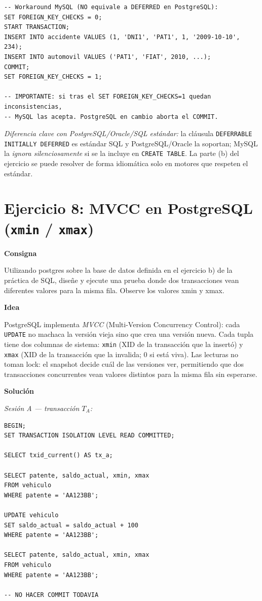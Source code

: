 \documentclass[11pt,a4paper]{article}
\newcommand{\itemcabecera}[1]{\noindent\textbf{#1}\par\medskip}
\newcommand{\bloqueConsigna}{\itemcabecera{Consigna}}
\newcommand{\bloqueIdea}{\itemcabecera{Idea}}
\newcommand{\bloqueSolucion}{\itemcabecera{Soluci\'on}}
\begin{document}
\begin{lstlisting}
-- Workaround MySQL (NO equivale a DEFERRED en PostgreSQL):
SET FOREIGN_KEY_CHECKS = 0;
START TRANSACTION;
INSERT INTO accidente VALUES (1, 'DNI1', 'PAT1', 1, '2009-10-10', 234);
INSERT INTO automovil VALUES ('PAT1', 'FIAT', 2010, ...);
COMMIT;
SET FOREIGN_KEY_CHECKS = 1;

-- IMPORTANTE: si tras el SET FOREIGN_KEY_CHECKS=1 quedan inconsistencias,
-- MySQL las acepta. PostgreSQL en cambio aborta el COMMIT.
\end{lstlisting}

\textit{Diferencia clave con PostgreSQL/Oracle/SQL estándar:} la cláusula \texttt{DEFERRABLE INITIALLY DEFERRED} es estándar SQL y PostgreSQL/Oracle la soportan; MySQL la \emph{ignora silenciosamente} si se la incluye en \texttt{CREATE TABLE}. La parte (b) del ejercicio se puede resolver de forma idiomática solo en motores que respeten el estándar.

\section{Ejercicio 8: MVCC en PostgreSQL (\texttt{xmin} / \texttt{xmax})}

\bloqueConsigna

Utilizando postgres sobre la base de datos definida en el ejercicio b) de la práctica de SQL, diseñe y ejecute una prueba donde dos transacciones vean diferentes valores para la misma fila. Observe los valores xmin y xmax.

\bloqueIdea

PostgreSQL implementa \emph{MVCC} (Multi-Version Concurrency Control): cada \texttt{UPDATE} no machaca la versión vieja sino que crea una versión nueva. Cada tupla tiene dos columnas de sistema: \texttt{xmin} (XID de la transacción que la insertó) y \texttt{xmax} (XID de la transacción que la invalida; 0 si está viva). Las lecturas no toman lock: el snapshot decide cuál de las versiones ver, permitiendo que dos transacciones concurrentes vean valores distintos para la misma fila sin esperarse.

\bloqueSolucion

\textit{Sesión A --- transacción $T_A$:}

\begin{lstlisting}
BEGIN;
SET TRANSACTION ISOLATION LEVEL READ COMMITTED;

SELECT txid_current() AS tx_a;

SELECT patente, saldo_actual, xmin, xmax
FROM vehiculo
WHERE patente = 'AA123BB';

UPDATE vehiculo
SET saldo_actual = saldo_actual + 100
WHERE patente = 'AA123BB';

SELECT patente, saldo_actual, xmin, xmax
FROM vehiculo
WHERE patente = 'AA123BB';

-- NO HACER COMMIT TODAVIA
\end{lstlisting}
\end{document}
